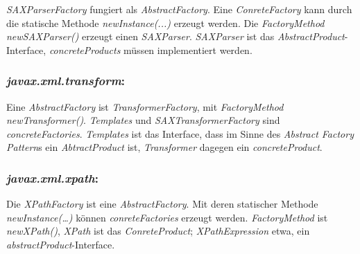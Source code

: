 \documentclass[a4paper]{article}
\begin{document}
	\textit{SAXParserFactory} fungiert als \textit{AbstractFactory}. 
	Eine \textit{ConreteFactory} kann durch die statische Methode \textit{newInstance(...)} erzeugt werden.
	Die \textit{FactoryMethod newSAXParser()} erzeugt einen \textit{SAXParser}. \textit{SAXParser} ist das \textit{AbstractProduct}-Interface, 
	\textit{concreteProducts} müssen implementiert werden.
	
	\subsubsection*{\textit{javax.xml.transform}:} 
	
	Eine \textit{AbstractFactory} ist \textit{TransformerFactory}, mit \textit{FactoryMethod newTransformer()}. 
	\textit{Templates} und \textit{SAXTransformerFactory} sind \textit{concreteFactories}. \textit{Templates} ist das Interface, 
	dass im Sinne des \emph{Abstract Factory Pattern}s ein \textit{AbtractProduct} ist, \textit{Transformer} dagegen ein
	\textit{concreteProduct}.
	
	\subsubsection*{\textit{javax.xml.xpath}:}
	
	Die \textit{XPathFactory} ist eine \textit{AbstractFactory}. Mit deren statischer Methode \textit{newInstance(\dots)} können \textit{conreteFactories} erzeugt werden.
	\textit{FactoryMethod} ist \textit{newXPath()}, \textit{XPath} ist das \textit{ConreteProduct}; \textit{XPathExpression} etwa, ein \textit{abstractProduct}-Interface.
	
	
\end{document}
